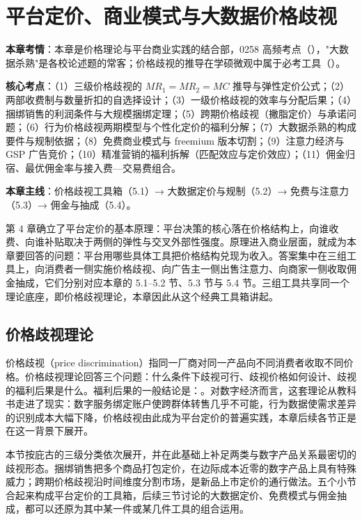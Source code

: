 \chapter{平台定价、商业模式与大数据价格歧视}

\begin{examguide}
\textbf{本章考情}：本章是价格理论与平台商业实践的结合部，0258 高频考点（），"大数据杀熟"是各校论述题的常客；价格歧视的推导在学硕微观中属于必考工具（）。

\textbf{核心考点}：（1）三级价格歧视的 $MR_1 = MR_2 = MC$ 推导与弹性定价公式；（2）两部收费制与数量折扣的自选择设计；（3）一级价格歧视的效率与分配后果；（4）捆绑销售的利润条件与大规模捆绑定理；（5）跨期价格歧视（撇脂定价）与承诺问题；（6）行为价格歧视两期模型与个性化定价的福利分解；（7）大数据杀熟的构成要件与规制依据；（8）免费商业模式与 freemium 版本切割；（9）注意力经济与 GSP 广告竞价；（10）精准营销的福利拆解（匹配效应与定价效应）；（11）佣金归宿、最优佣金率与接入费—交易费组合。

\textbf{本章主线}：价格歧视工具箱（5.1）→ 大数据定价与规制（5.2）→ 免费与注意力（5.3）→ 佣金与抽成（5.4）。
\end{examguide}

第 4 章确立了平台定价的基本原理：平台决策的核心落在价格结构上，向谁收费、向谁补贴取决于两侧的弹性与交叉外部性强度。原理进入商业层面，就成为本章要回答的问题：平台用哪些具体工具把价格结构兑现为收入。答案集中在三组工具上，向消费者一侧实施价格歧视、向广告主一侧出售注意力、向商家一侧收取佣金抽成，它们分别对应本章的 5.1--5.2 节、5.3 节与 5.4 节。三组工具共享同一个理论底座，即价格歧视理论，本章因此从这个经典工具箱讲起。

\section{价格歧视理论}

价格歧视（price discrimination）指同一厂商对同一产品向不同消费者收取不同价格。价格歧视理论回答三个问题：什么条件下歧视可行、歧视价格如何设计、歧视的福利后果是什么。福利后果的一般结论是：。对数字经济而言，这套理论从教科书走进了现实：数字服务绑定账户使跨群体转售几乎不可能，行为数据使需求差异的识别成本大幅下降，价格歧视由此成为平台定价的普遍实践，本章后续各节正是在这一背景下展开。

本节按庇古的三级分类依次展开，并在此基础上补足两类与数字产品关系最密切的歧视形态。捆绑销售把多个商品打包定价，在边际成本近零的数字产品上具有特殊威力；跨期价格歧视沿时间维度分割市场，是新品上市定价的通行做法。五个小节合起来构成平台定价的工具箱，后续三节讨论的大数据定价、免费模式与佣金抽成，都可以还原为其中某一件或某几件工具的组合运用。

